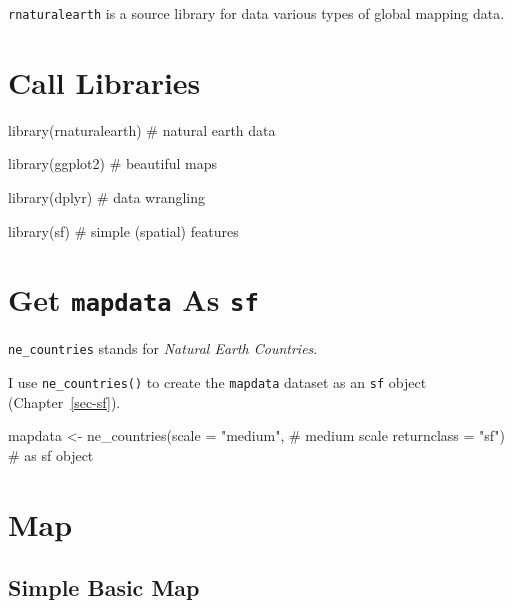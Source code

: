 \documentclass[
  letterpaper,
  DIV=11,
  numbers=noendperiod,
  oneside]{scrreprt}
\newenvironment{Shaded}{\begin{snugshade}}{\end{snugshade}}
\newcommand{\AttributeTok}[1]{\textcolor[rgb]{0.40,0.45,0.13}{#1}}
\newcommand{\CommentTok}[1]{\textcolor[rgb]{0.37,0.37,0.37}{#1}}
\newcommand{\FunctionTok}[1]{\textcolor[rgb]{0.28,0.35,0.67}{#1}}
\newcommand{\NormalTok}[1]{\textcolor[rgb]{0.00,0.23,0.31}{#1}}
\newcommand{\OtherTok}[1]{\textcolor[rgb]{0.00,0.23,0.31}{#1}}
\newcommand{\StringTok}[1]{\textcolor[rgb]{0.13,0.47,0.30}{#1}}
\begin{document}
\texttt{rnaturalearth} is a source library for data various types of
global mapping data.

\section{Call Libraries}\label{call-libraries-2}

\begin{Shaded}
\begin{Highlighting}[]
\FunctionTok{library}\NormalTok{(rnaturalearth) }\CommentTok{\# natural earth data}

\FunctionTok{library}\NormalTok{(ggplot2) }\CommentTok{\# beautiful maps}

\FunctionTok{library}\NormalTok{(dplyr) }\CommentTok{\# data wrangling}

\FunctionTok{library}\NormalTok{(sf) }\CommentTok{\# simple (spatial) features}
\end{Highlighting}
\end{Shaded}

\section{\texorpdfstring{Get \texttt{mapdata} As
\texttt{sf}}{Get mapdata As sf}}\label{get-mapdata-as-sf}

\texttt{ne\_countries} stands for \emph{Natural Earth Countries}.

I use \texttt{ne\_countries()} to create the \texttt{mapdata} dataset as
an \texttt{sf} object (Chapter~\ref{sec-sf}).

\begin{Shaded}
\begin{Highlighting}[]
\NormalTok{mapdata }\OtherTok{\textless{}{-}} \FunctionTok{ne\_countries}\NormalTok{(}\AttributeTok{scale =} \StringTok{"medium"}\NormalTok{, }\CommentTok{\# medium scale}
                        \AttributeTok{returnclass =} \StringTok{"sf"}\NormalTok{) }\CommentTok{\# as sf object}
\end{Highlighting}
\end{Shaded}

\section{Map}\label{map}

\subsection{Simple Basic Map}\label{simple-basic-map}
\end{document}
